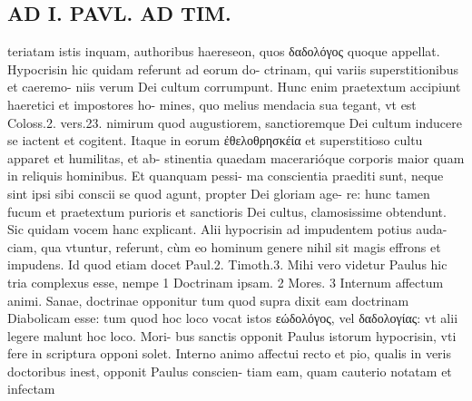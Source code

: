 \documentclass{article}
\begin{document}
\begin{pages}
\section*{AD I. PAVL. AD TIM. }
\marginpar{[ p.104 ]}\pstart teriatam istis inquam, authoribus haereseon, quos δαδολόγος quoque appellat.  \pend\pstart Hypocrisin hic quidam referunt ad eorum do- ctrinam, qui variis superstitionibus et caeremo- niis verum Dei cultum corrumpunt. Hunc enim praetextum accipiunt haeretici et impostores ho- mines, quo melius mendacia sua tegant, vt est Coloss.2. vers.23. nimirum quod augustiorem, sanctioremque Dei cultum inducere se iactent et cogitent. Itaque in eorum ἐθελοθρησκέία et superstitioso cultu apparet et humilitas, et ab- stinentia quaedam macerarióque corporis maior quam in reliquis hominibus. Et quanquam pessi- ma conscientia praediti sunt, neque sint ipsi sibi conscii se quod agunt, propter Dei gloriam age- re: hunc tamen fucum et praetextum purioris et sanctioris Dei cultus, clamosissime obtendunt. Sic quidam vocem hanc explicant.  \pend\pstart Alii hypocrisin ad impudentem potius auda- ciam, qua vtuntur, referunt, cùm eo hominum genere nihil sit magis effrons et impudens. Id quod etiam docet Paul.2. Timoth.3. Mihi vero videtur Paulus hic tria complexus esse, nempe 1 Doctrinam ipsam. 2 Mores. 3 Internum affectum animi. Sanae, doctrinae opponitur tum quod supra dixit eam doctrinam Diabolicam esse: tum quod hoc loco vocat istos εώδολόγος, vel δαδολογίας: vt alii legere malunt hoc loco. Mori- bus sanctis opponit Paulus istorum hypocrisin, vti fere in scriptura opponi solet.  \pend\pstart Interno animo affectui recto et pio, qualis in veris doctoribus inest, opponit Paulus conscien- tiam eam, quam cauterio notatam et infectam  \pend

\end{pages}
\end{document}
